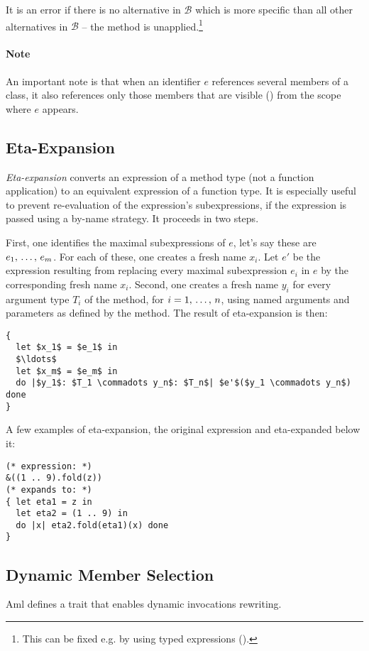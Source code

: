 It is an error if there is no alternative in $\mathcal{B}$ which is more specific than all other alternatives in $\mathcal{B}$ -- the method is unapplied.\footnote{This can be fixed e.g. by using typed expressions ().}

\paragraph{Note}
An important note is that when an identifier $e$ references several members of a class, it also references only those members that are visible () from the scope where $e$ appears. 






\subsection{Eta-Expansion}
\label{sec:eta-expansion}

{\em Eta-expansion} converts an expression of a method type (not a function application) to an equivalent expression of a function type. It is especially useful to prevent re-evaluation of the expression's subexpressions, if the expression is passed using a by-name strategy. It proceeds in two steps. 

First, one identifies the maximal subexpressions of $e$, let's say these are $e_1 ,\, \ldots ,\, e_m$. For each of these, one creates a fresh name $x_i$. Let $e'$ be the expression resulting from replacing every maximal subexpression $e_i$ in $e$ by the corresponding fresh name $x_i$. Second, one creates a fresh name $y_i$ for every argument type $T_i$ of the method, for $i = 1 ,\, \ldots ,\, n$, using named arguments and parameters as defined by the method. The result of eta-expansion is then: 
\begin{lstlisting}
{
  let $x_1$ = $e_1$ in
  $\ldots$
  let $x_m$ = $e_m$ in
  do |$y_1$: $T_1 \commadots y_n$: $T_n$| $e'$($y_1 \commadots y_n$) done
}
\end{lstlisting}

\example A few examples of eta-expansion, the original expression and eta-expanded below it:
\begin{lstlisting}
(* expression: *)
&((1 .. 9).fold(z))
(* expands to: *)
{ let eta1 = z in
  let eta2 = (1 .. 9) in
  do |x| eta2.fold(eta1)(x) done 
}
\end{lstlisting}







\subsection{Dynamic Member Selection}
\label{sec:dynamic-member-selection}

Aml defines a trait  that enables dynamic invocations rewriting. 











